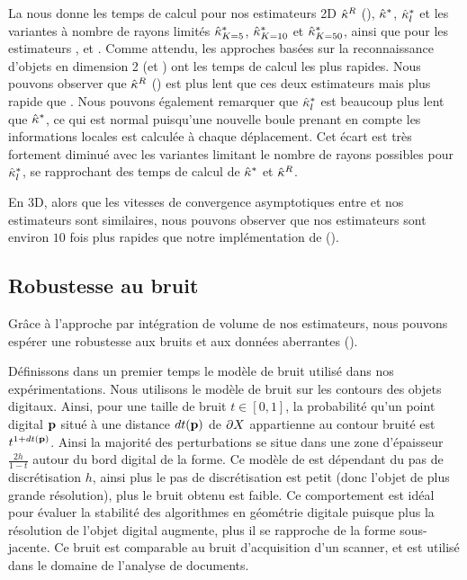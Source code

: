 La  nous donne les temps de calcul pour
nos estimateurs 2D $\hat{\kappa}^{R}$ (\II), $\hat{\kappa}^{*}$, $\hat{\kappa}^{*}_{l}$ et les variantes à
nombre de rayons limités $\hat{\kappa}^{*}_{K=5}$, $\hat{\kappa}^{*}_{K=10}$ et $\hat{\kappa}^{*}_{K=50}$,
ainsi que pour les estimateurs \BC, \MDSS et \MDCA. Comme attendu, les approches
basées sur la reconnaissance d'objets en dimension 2 (\MDSS et \MDCA) ont les
temps de calcul les plus rapides. Nous pouvons observer que $\hat{\kappa}^{R}$ (\II) est
plus lent que ces deux estimateurs mais plus rapide que \BC. Nous pouvons
également remarquer que $\hat{\kappa}^{*}_{l}$ est beaucoup plus lent que $\hat{\kappa}^{*}$, ce qui
est normal puisqu'une nouvelle boule prenant en compte les informations locales
est calculée à chaque déplacement. Cet écart est très fortement diminué avec les
variantes limitant le nombre de rayons possibles pour $\hat{\kappa}^{*}_{l}$, se rapprochant
des temps de calcul de $\hat{\kappa}^{*}$ et $\hat{\kappa}^{R}$.


En 3D, alors que les vitesses de convergence asymptotiques entre \JetFitting et
nos estimateurs sont similaires, nous pouvons observer que nos estimateurs sont
environ $10$ fois plus rapides que notre implémentation de \JetFitting (\CGal \cite{CGal}).
%
\subsection{Robustesse au bruit}
\label{sec:kanungo-noise}
%
Grâce à l'approche par intégration de volume de nos estimateurs, nous pouvons
espérer une robustesse aux bruits et aux données aberrantes ().


Définissons dans un premier temps le modèle de bruit utilisé dans nos
expérimentations. Nous utilisons le modèle de bruit \Kanungo \cite{Kanungo1996}
sur les contours des objets digitaux. Ainsi, pour une taille de bruit $t \in
[0,1]$, la probabilité qu'un point digital $\mathbf{p}$ situé à une distance $dt(\mathbf{p})$
de $\partial X$ appartienne au contour bruité est $t^{1+dt(\mathbf{p})}$. Ainsi la majorité
des perturbations se situe dans une zone d'épaisseur $\frac{2h}{1-t}$ autour du
bord digital de la forme. Ce modèle de \Kanungo est dépendant du pas de
discrétisation $h$, ainsi plus le pas de discrétisation est petit (donc l'objet
de plus grande résolution), plus le bruit obtenu est faible. Ce comportement est
idéal pour évaluer la stabilité des algorithmes en géométrie digitale
\cite{Kerautret2012} puisque plus la résolution de l'objet digital augmente,
plus il se rapproche de la forme sous-jacente. Ce bruit est comparable au bruit
d'acquisition d'un scanner, et est utilisé dans le domaine de l'analyse de
documents.


